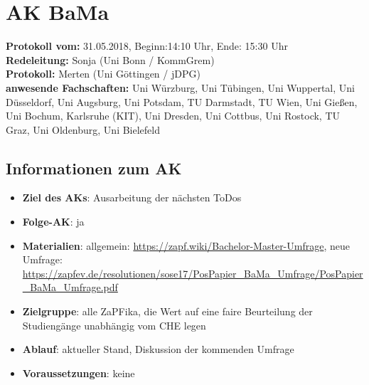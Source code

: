 
\section{AK BaMa}

	\textbf{Protokoll vom:} 31.05.2018,
	Beginn:14:10 Uhr,
	Ende: 15:30 Uhr \\
	\textbf{Redeleitung:} Sonja (Uni Bonn / KommGrem) \\
	\textbf{Protokoll:} Merten (Uni Göttingen / jDPG) \\
	\textbf{anwesende Fachschaften:} Uni Würzburg, Uni Tübingen, Uni Wuppertal, Uni Düsseldorf, Uni Augsburg, Uni Potsdam, TU Darmstadt, TU Wien, Uni Gießen, Uni Bochum, Karlsruhe (KIT), Uni Dresden, Uni Cottbus, Uni Rostock, TU Graz, Uni Oldenburg, Uni Bielefeld

	\subsection*{Informationen zum AK}
		\begin{itemize}
			\item \textbf{Ziel des AKs}: Ausarbeitung der nächsten ToDos
			\item \textbf{Folge-AK}: ja
      \item \textbf{Materialien}: allgemein: \url{https://zapf.wiki/Bachelor-Master-Umfrage}, neue Umfrage: \url{https://zapfev.de/resolutionen/sose17/PosPapier_BaMa_Umfrage/PosPapier_BaMa_Umfrage.pdf}
			\item \textbf{Zielgruppe}: alle ZaPFika, die Wert auf eine faire Beurteilung der Studiengänge unabhängig vom CHE legen
			\item \textbf{Ablauf}: aktueller Stand, Diskussion der kommenden Umfrage
			\item \textbf{Voraussetzungen}: keine
		\end{itemize}

